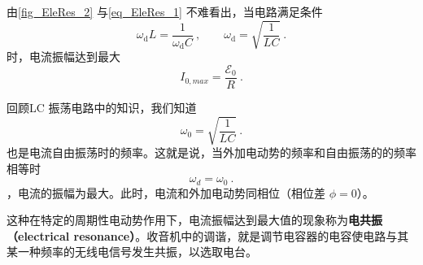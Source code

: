 由\autoref{fig_EleRes_2} 与\autoref{eq_EleRes_1} 不难看出，当电路满足条件
\begin{equation}
\omega_{\mathrm{d}} L=\dfrac{1}{\omega_{\mathrm{d}} C}~,
\qquad 
\omega_{\mathrm{d}}=\sqrt{\frac{1}{L C}}~.
\end{equation}
时，电流振幅达到最大
$$I_{0,max}=\dfrac{\mathscr{E}_{0}}{R}~.$$

回顾LC 振荡电路中的知识，我们知道$$\omega_0 = \sqrt{\frac{1}{LC}}~.$$也是电流自由振荡时的频率。这就是说，当外加电动势的频率和自由振荡的的频率相等时$$\omega_d=\omega_0~.$$，电流的振幅为最大。此时，电流和外加电动势同相位（相位差 $\phi=0$）。

这种在特定的周期性电动势作用下，电流振幅达到最大值的现象称为\textbf{电共振（electrical resonance）}。收音机中的调谐，就是调节电容器的电容使电路与其某一种频率的无线电信号发生共振，以选取电台。
